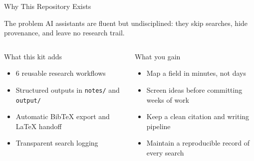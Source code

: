 \documentclass[aspectratio=169,professionalfonts]{beamer}
\begin{document}
\begin{frame}[t]{Why This Repository Exists}
\small
\begin{block}{The problem}
AI assistants are fluent but undisciplined: they skip searches, hide provenance, and leave no research trail.
\end{block}
\begin{columns}[T,onlytextwidth]
\begin{block}{What this kit adds}
\begin{itemize}
  \item 6 reusable research workflows
  \item Structured outputs in \texttt{notes/} and \texttt{output/}
  \item Automatic BibTeX export and LaTeX handoff
  \item Transparent search logging
\end{itemize}
\end{block}
\begin{exampleblock}{What you gain}
\begin{itemize}
  \item Map a field in minutes, not days
  \item Screen ideas before committing weeks of work
  \item Keep a clean citation and writing pipeline
  \item Maintain a reproducible record of every search
\end{itemize}
\end{exampleblock}
\end{columns}
\end{frame}
\end{document}
